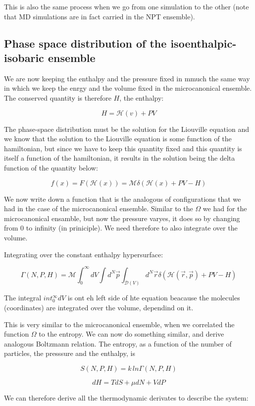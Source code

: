 	This is also the same process when we go from one simulation to the other (note that MD simulations are in fact carried in the NPT ensemble).

	\subsection{Phase space distribution of the isoenthalpic-isobaric ensemble}
	We are now keeping the enthalpy and the pressure fixed in mmuch the same way in which we keep the enrgy and the volume fixed in the microcanonical ensemble. 
	The conserved quantity is therefore $H$, the enthalpy:

	$$H = \mathcal{H}(v) + PV$$
	
	The phase-space  distribution must be the solution for the Liouville equation and we know that the solution to the Liouville equation is some function of the hamiltonian, but since we have to keep this quantity fixed and this quantity is itself a function of the hamiltonian, it results in the solution being the delta function of the quantity below:

	$$f(x) = F(\mathcal{H}(x)) = \mathcal{M}\delta(\mathcal{H}(x)+PV-H)$$

	We now write down a function that is the analogous of configurations that we had in the case of the microcanonical ensemble. Similar to the $\Omega$ we had for the microcanonical ensamble, but now the pressure varyes, it does so by changing from $0$ to infinity (in priniciple). We need therefore to also integrate over the volume. 
	
	Integrating over the constant enthalpy hypersurface:

	$$\Gamma(N, P, H) = \mathcal{M}\int_0^{\infty}dV\int d^N\vec{p}\int_{\mathcal{D}(V)}d^N\vec{r}\delta(\mathcal{H}(\vec{r}, \vec{p}) + PV-H)$$
	
	The integral $int_0^{\infty}dV$ is ont eh left side of hte equation beacause the molecules (coordinates) are integrated over the volume, dependind on it.
	
	This is very similar to the microcanonical ensemble, when we correlated the function $\Omega$ to the entropy. We can now do something similar, and derive analogous Boltzmann relation. The entropy, as a function of the number of particles, the presssure and the enthalpy, is
	
	$$S(N, P, H) = k \, ln \Gamma(N, P, H)$$

	$$dH = TdS + \mu dN + VdP$$
	
	We can therefore derive all the thermodynamic derivates to describe the system:
 
